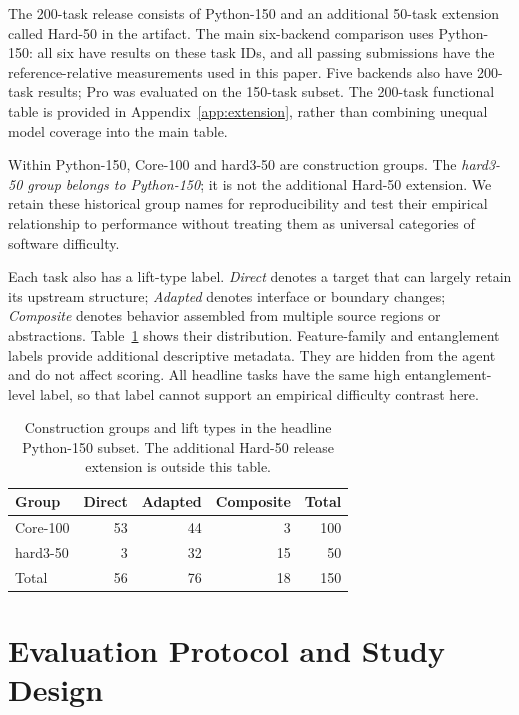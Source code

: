 \documentclass[acmsmall,screen,review,anonymous]{acmart}
\begin{document}
The 200-task release consists of Python-150 and an additional 50-task extension
called Hard-50 in the artifact. The main six-backend comparison uses Python-150:
all six have results on these task IDs, and all passing submissions have the
reference-relative measurements used in this paper. Five backends also have
200-task results; Pro was evaluated on the 150-task subset. The 200-task
functional table is provided in Appendix~\ref{app:extension}, rather than
combining unequal model coverage into the main table.

Within Python-150, Core-100 and hard3-50 are construction groups. The
\emph{hard3-50 group belongs to Python-150}; it is not the additional Hard-50
extension. We retain these historical group names for reproducibility and test
their empirical relationship to performance without treating them as universal
categories of software difficulty.

Each task also has a lift-type label. \emph{Direct} denotes a target that can
largely retain its upstream structure; \emph{Adapted} denotes interface or
boundary changes; \emph{Composite} denotes behavior assembled from multiple
source regions or abstractions. Table~\ref{tab:construction} shows their
distribution. Feature-family and entanglement labels provide additional
descriptive metadata. They are hidden from the agent and do not affect scoring.
All headline tasks have the same high entanglement-level label, so that label
cannot support an empirical difficulty contrast here.

\begin{table}[t]
 \caption{Construction groups and lift types in the headline Python-150 subset.
 The additional Hard-50 release extension is outside this table.}
 \label{tab:construction}
 \centering
 \begin{tabular}{@{}lrrrr@{}}
 \toprule
 Group & Direct & Adapted & Composite & Total \\
 \midrule
 Core-100 & 53 & 44 & 3 & 100 \\
 hard3-50 & 3 & 32 & 15 & 50 \\
 \midrule
 Total & 56 & 76 & 18 & 150 \\
 \bottomrule
 \end{tabular}
\end{table}

\section{Evaluation Protocol and Study Design}
\label{sec:protocol}
\end{document}

